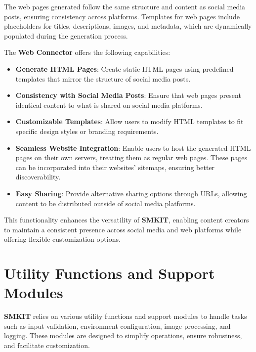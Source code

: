 The web pages generated follow the same structure and content as social media posts, ensuring consistency across platforms. Templates for web pages include placeholders for titles, descriptions, images, and metadata, which are dynamically populated during the generation process.

The \textbf{Web Connector} offers the following capabilities:
\begin{itemize}
    \item \textbf{Generate HTML Pages}: Create static HTML pages using predefined templates that mirror the structure of social media posts.
    \item \textbf{Consistency with Social Media Posts}: Ensure that web pages present identical content to what is shared on social media platforms.
    \item \textbf{Customizable Templates}: Allow users to modify HTML templates to fit specific design styles or branding requirements.
    \item \textbf{Seamless Website Integration}: Enable users to host the generated HTML pages on their own servers, treating them as regular web pages. These pages can be incorporated into their websites' sitemaps, ensuring better discoverability.
    \item \textbf{Easy Sharing}: Provide alternative sharing options through URLs, allowing content to be distributed outside of social media platforms.
\end{itemize}

This functionality enhances the versatility of \textbf{SMKIT}, enabling content creators to maintain a consistent presence across social media and web platforms while offering flexible customization options.


\section{Utility Functions and Support Modules}
\label{sec:utility_functions_and_support_modules}
\textbf{SMKIT} relies on various utility functions and support modules to handle tasks such as input validation, environment configuration, image processing, and logging. These modules are designed to simplify operations, ensure robustness, and facilitate customization.

